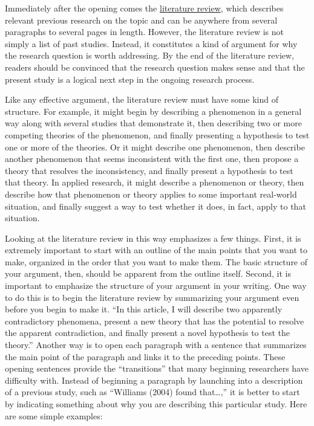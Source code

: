 \documentclass[
]{krantz}
\begin{document}
Immediately after the opening comes the \hyperref[literature-review]{literature review}, which describes relevant previous research on the topic and can be anywhere from several paragraphs to several pages in length. However, the literature review is not simply a list of past studies. Instead, it constitutes a kind of argument for why the research question is worth addressing. By the end of the literature review, readers should be convinced that the research question makes sense and that the present study is a logical next step in the ongoing research process.

Like any effective argument, the literature review must have some kind of structure. For example, it might begin by describing a phenomenon in a general way along with several studies that demonstrate it, then describing two or more competing theories of the phenomenon, and finally presenting a hypothesis to test one or more of the theories. Or it might describe one phenomenon, then describe another phenomenon that seems inconsistent with the first one, then propose a theory that resolves the inconsistency, and finally present a hypothesis to test that theory. In applied research, it might describe a phenomenon or theory, then describe how that phenomenon or theory applies to some important real-world situation, and finally suggest a way to test whether it does, in fact, apply to that situation.

Looking at the literature review in this way emphasizes a few things. First, it is extremely important to start with an outline of the main points that you want to make, organized in the order that you want to make them. The basic structure of your argument, then, should be apparent from the outline itself. Second, it is important to emphasize the structure of your argument in your writing. One way to do this is to begin the literature review by summarizing your argument even before you begin to make it. ``In this article, I will describe two apparently contradictory phenomena, present a new theory that has the potential to resolve the apparent contradiction, and finally present a novel hypothesis to test the theory.'' Another way is to open each paragraph with a sentence that summarizes the main point of the paragraph and links it to the preceding points. These opening sentences provide the ``transitions'' that many beginning researchers have difficulty with. Instead of beginning a paragraph by launching into a description of a previous study, such as ``Williams (2004) found that\ldots,'' it is better to start by indicating something about why you are describing this particular study. Here are some simple examples:
\end{document}
